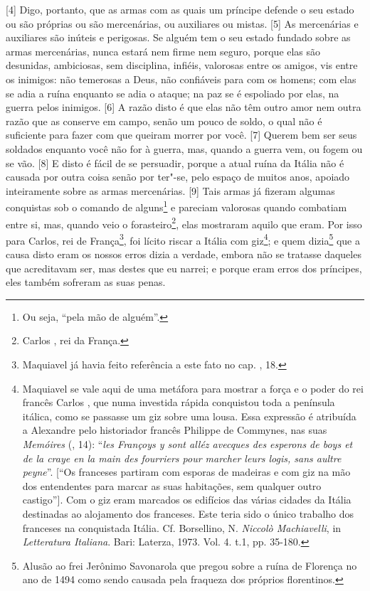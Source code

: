 {[}4{]} Digo, portanto, que as armas com as quais um príncipe defende o
seu estado ou são próprias ou são mercenárias, ou auxiliares ou mistas.
{[}5{]} As mercenárias e auxiliares são inúteis e perigosas. Se alguém
tem o seu estado fundado sobre as armas mercenárias, nunca estará nem
firme nem seguro, porque elas são desunidas, ambiciosas, sem disciplina,
infiéis, valorosas entre os amigos, vis entre os inimigos: não temerosas
a Deus, não confiáveis para com os homens; com elas se adia a ruína
enquanto se adia o ataque; na paz se é espoliado por elas, na guerra
pelos inimigos. {[}6{]} A razão disto é que elas não têm outro amor nem
outra razão que as conserve em campo, senão um pouco de soldo, o qual
não é suficiente para fazer com que queiram morrer por você. {[}7{]}
Querem bem ser seus soldados enquanto você não for à guerra, mas, quando
a guerra vem, ou fogem ou se vão. {[}8{]} E disto é fácil de se
persuadir, porque a atual ruína da Itália não é causada por outra coisa
senão por ter"-se, pelo espaço de muitos anos, apoiado inteiramente sobre
as armas mercenárias. {[}9{]} Tais armas já fizeram algumas conquistas
sob o comando de alguns\footnote{Ou seja, ``pela mão de alguém''.} e
pareciam valorosas quando combatiam entre si, mas, quando veio o
forasteiro\footnote{Carlos , rei da França.}, elas mostraram aquilo que
eram. Por isso para Carlos, rei de França\footnote{Maquiavel já havia
  feito referência a este fato no cap. , 18.}, foi lícito riscar a
Itália com giz\footnote{Maquiavel se vale aqui de uma metáfora para
  mostrar a força e o poder do rei francês Carlos , que numa investida
  rápida conquistou toda a península itálica, como se passasse um giz
  sobre uma lousa. Essa expressão é atribuída a Alexandre  pelo
  historiador francês Philippe de Commynes, nas suas \emph{Memóires}
  (, 14): ``\emph{les Françoys y sont alléz avecques des esperons de
  boys et de la craye en la main des fourriers pour marcher leurs logis,
  sans aultre peyne}''. {[}``Os franceses partiram com esporas de
  madeiras e com giz na mão dos entendentes para marcar as suas
  habitações, sem qualquer outro castigo''{]}. Com o giz eram marcados
  os edifícios das várias cidades da Itália destinadas ao alojamento dos
  franceses. Este teria sido o único trabalho dos franceses na
  conquistada Itália. Cf. Borsellino, N. \emph{Niccolò
  Machiavelli}, in \emph{Letteratura Italiana}. Bari: Laterza, 1973.
  Vol. 4. t.1, pp. 35-180.}; e quem dizia\footnote{Alusão ao frei
  Jerônimo Savonarola que pregou sobre a ruína de Florença no ano de
  1494 como sendo causada pela fraqueza dos próprios florentinos.} que a
causa disto eram os nossos erros dizia a verdade, embora não se tratasse
daqueles que acreditavam ser, mas destes que eu narrei; e porque eram
erros dos príncipes, eles também sofreram as suas penas.

